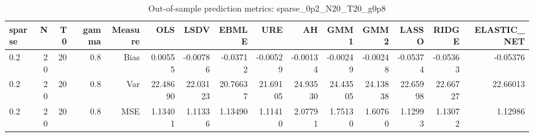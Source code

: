 \begin{table}[!htbp]\centering
\caption{Out-of-sample prediction metrics: sparse_0p2_N20_T20_g0p8}
\label{tab:table3_sparse_0p2_N20_T20_g0p8}
\begin{tabular}{lrrrrrrrrrrrrrr}
\hline
sparse & N & T0 & gamma & Measure & OLS & LSDV & EBMLE & URE & AH & GMM1 & GMM2 & LASSO & RIDGE & ELASTIC_NET \\
\hline
0.2 & 20 & 20 & 0.8 & Bias & 0.00555 & -0.00786 & -0.03712 & -0.00529 & -0.00134 & -0.00249 & -0.00248 & -0.05374 & -0.05363 & -0.05376 \\
0.2 & 20 & 20 & 0.8 & Var & 22.48690 & 22.03123 & 20.76637 & 21.69105 & 24.93530 & 24.43505 & 24.13838 & 22.65998 & 22.66727 & 22.66013 \\
0.2 & 20 & 20 & 0.8 & MSE & 1.13401 & 1.11336 & 1.13490 & 1.11410 & 2.07791 & 1.75130 & 1.60760 & 1.12993 & 1.13072 & 1.12986 \\
\hline
\end{tabular}
\end{table}

